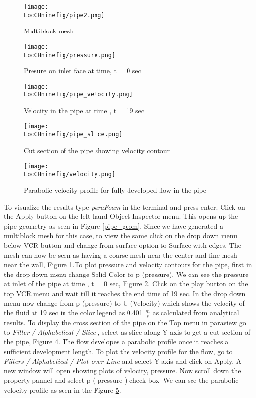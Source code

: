 \begin{figure}[h]  
\centering
\texttt{[image: \\LocCHninefig/pipe2.png]}
\caption{Multiblock mesh}
\label{pipe_mesh}
\end{figure}

\begin{figure}[h]  
\centering
\texttt{[image: \\LocCHninefig/pressure.png]}
\caption{Presure on inlet face at time, t = 0 sec}
\label{pipe_pressure}
\end{figure}

\begin{figure}[h]  
\centering
\texttt{[image: \\LocCHninefig/pipe\_velocity.png]}
\caption{Velocity in the pipe at time , t = 19 sec}
\label{pipe_velocity}
\end{figure}

\begin{figure}[h]  
\centering
\texttt{[image: \\LocCHninefig/pipe\_slice.png]}
\caption{Cut section of the pipe showing velocity contour}
\label{pipe_slice}
\end{figure}

\begin{figure}[h]  
\centering
\texttt{[image: \\LocCHninefig/velocity.png]}
\caption{Parabolic velocity profile for fully developed flow in the pipe}
\label{pipe_parabolic}
\end{figure}

To visualize the results type \textit{paraFoam} in the terminal and press enter. Click on the Apply button on the left hand Object Inspector menu. This opens up the pipe geometry as seen in Figure \ref{pipe_geom}. Since we have generated a multiblock mesh for this case, to view the same click on the drop down menu below VCR button and change from surface option to Surface with edges. The mesh can now be seen as having a coarse mesh near the center and fine mesh near the wall, Figure \ref{pipe_mesh}.To plot pressure and velocity contours for the pipe, first in the drop down menu change Solid Color to p (pressure). We can see the pressure at inlet of the pipe at time , t = 0 sec, Figure \ref{pipe_pressure}. Click on the play button on the top VCR menu and wait till it reaches the end time of 19 sec. In the drop down menu now change from p (pressure) to U (Velocity) which shows the velocity of the fluid at 19 sec in the color legend as 0.401 $\frac{m}{s}$ as calculated from analytical results. To display the cross section of the pipe on the Top menu in paraview go to \textit{Filter / Alphabetical / Slice }, select as slice along Y axis to get a cut section of the pipe, Figure  \ref{pipe_slice}. The flow developes a parabolic profile once it reaches a sufficient development length. To plot the velocity profile for the flow, go to \textit{Filters / Alphabetical / Plot over Line} and select Y axis and click on Apply. A new window will open showing plots of velocity, pressure. Now scroll down the property pannel and select p ( pressure ) check box. We can see the parabolic velocity profile as seen in the Figure \ref{pipe_parabolic}.

